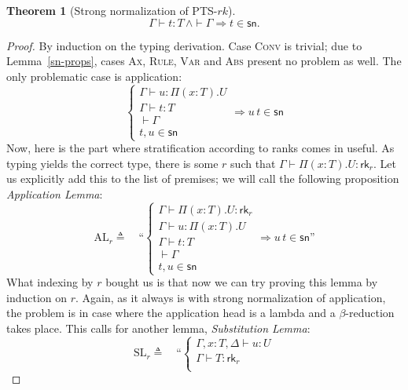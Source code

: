 \documentclass{article}
\newtheorem{theorem}{Theorem}
\theoremstyle{definition}
\theoremstyle{remark}
\begin{document}
\begin{theorem}[Strong normalization of PTS-$rk$\;]
\label{normalization}
    \[ \Gamma\vdash t:T\,\land\vdash\Gamma
    \Rightarrow t \in\mathsf{sn}. \]
\end{theorem}
\begin{proof}
    By induction on the typing derivation. Case
    \textsc{Conv} is trivial; due to
    Lemma~\ref{sn-props}, cases \textsc{Ax},
    \textsc{Rule}, \textsc{Var} and \textsc{Abs}
    present no problem as well. The only problematic
    case is application:
    \[
        \left\{\begin{array}{l}
            \Gamma\vdash u:\Pi(x:T).U \\
            \Gamma\vdash t:T \\
            \vdash\Gamma \\
            t,u\in\mathsf{sn}
        \end{array}\right.\Rightarrow
        u\,t\in\mathsf{sn}
    \]
    Now, here is the part where stratification
    according to ranks comes in useful. As typing
    yields the correct type, there is some $r$ such
    that $\Gamma\vdash \Pi(x:T).U:\mathsf{rk}_r$. Let
    us explicitly add this to the list of premises; we
    will call the following proposition
    \emph{Application Lemma}:
    \[ \mathrm{AL}_r \triangleq \quad
        \text{``}\left\{\begin{array}{l}
            \Gamma\vdash \Pi(x:T).U:\mathsf{rk}_r\\
            \Gamma\vdash u:\Pi(x:T).U \\
            \Gamma\vdash t:T \\
            \vdash\Gamma \\
            t,u\in\mathsf{sn}
        \end{array}\right.\Rightarrow
        u\,t\in\mathsf{sn}\text{''}
    \]
    What indexing by $r$ bought us is that now we can
    try proving this lemma by induction on $r$. Again,
    as it always is with strong normalization of
    application, the problem is in case where the
    application head is a lambda and a
    $\beta$-reduction takes place. This calls for
    another lemma, \emph{Substitution Lemma}:
    \[ \mathrm{SL}_r \triangleq \quad
        \text{``}\left\{\begin{array}{l}
            \Gamma,x:T,\Delta\vdash u:U\\
            \Gamma\vdash T:\mathsf{rk}_r\\

\end{array}\]
\end{proof}
\end{document}
